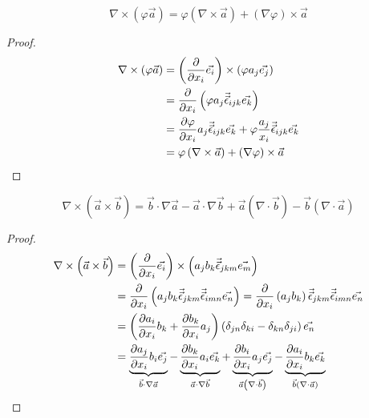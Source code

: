 \begin{proposition}
    \[
    \nabla\times\left(\varphi\vec{a}\right)=\varphi\left(\nabla\times\vec{a}\right)
    +\left(\nabla\varphi\right)\times\vec{a}
    \]
    \begin{proof}
        \begin{align*}
            \nabla\times\left(\varphi\vec{a}\right)
            &=\left(\frac{\partial}{\partial x_i}\vec{e_i}\right)\times\left(\varphi a_j\vec{e_j}\right)\\
            &=\frac{\partial}{\partial x_i}\left(\varphi a_j\vec{\vec{\epsilon}}_{ijk}\vec{e_k}\right)\\
            &=\frac{\partial \varphi}{\partial x_i}a_j\vec{\vec{\epsilon}}_{ijk}\vec{e_k}
            +\varphi\frac{a_j}{x_i}\vec{\vec{\epsilon}}_{ijk}\vec{e_k}\\
            &=\varphi\left(\nabla\times\vec{a}\right)+\left(\nabla\varphi\right)\times\vec{a}
        \end{align*}
    \end{proof}
\end{proposition}
\begin{proposition}
    \[
    \nabla\times\left(\vec{a}\times\vec{b}\right)=
    \vec{b}\cdot\nabla\vec{a}-\vec{a}\cdot\nabla\vec{b}+
    \vec{a}\left(\nabla\cdot\vec{b}\right)-\vec{b}\left(\nabla\cdot\vec{a}\right)
    \]
    \begin{proof}
        \begin{align*}
            \nabla\times\left(\vec{a}\times\vec{b}\right)
            &=\left(\frac{\partial}{\partial x_i}\vec{e_i}\right)\times\left(a_jb_k\vec{\vec{\epsilon}}_{jkm}\vec{e_m}\right)\\
            &=\frac{\partial}{\partial x_i}\left(a_jb_k\vec{\vec{\epsilon}}_{jkm}\vec{\vec{\epsilon}}_{imn}\vec{e_n}\right)
            =\frac{\partial}{\partial x_i}\left(a_jb_k\right)\vec{\vec{\epsilon}}_{jkm}\vec{\vec{\epsilon}}_{imn}\vec{e_n}\\
            &=\left(\frac{\partial a_i}{\partial x_i}b_k+\frac{\partial b_k}{\partial x_i}a_j\right)\left(\delta_{jn}\delta_{ki}-\delta_{kn}\delta_{ji}\right)\vec{e_n}\\
            &=\underbrace{\frac{\partial a_j}{\partial x_i}b_i\vec{e_j}}_{\vec{b}\cdot\nabla\vec{a}}
            -\underbrace{\frac{\partial b_k}{\partial x_i}a_i\vec{e_k}}_{\vec{a}\cdot\nabla\vec{b}}
            +\underbrace{\frac{\partial b_i}{\partial x_i}a_j\vec{e_j}}_{\vec{a}\left(\nabla\cdot\vec{b}\right)}
            -\underbrace{\frac{\partial a_i}{\partial x_i}b_k\vec{e_k}}_{\vec{b}\left(\nabla\cdot\vec{a}\right)}
        \end{align*}
    \end{proof}
\end{proposition}
